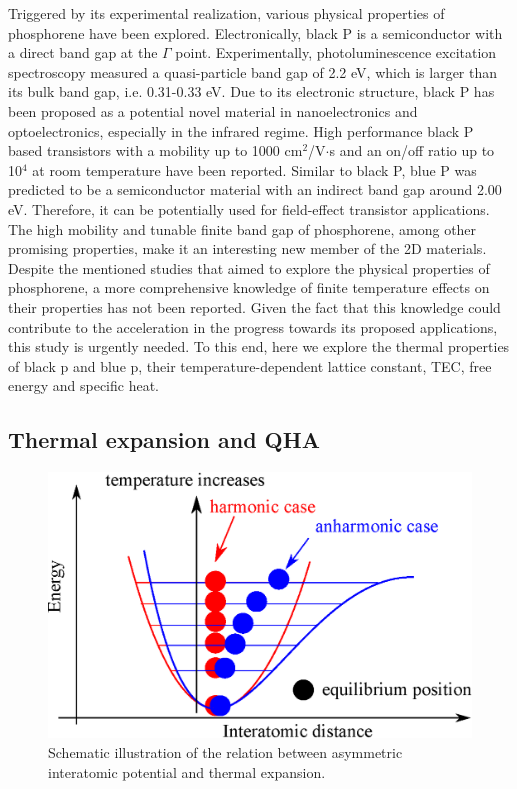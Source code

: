 Triggered by its experimental realization, various physical properties of phosphorene have been explored. Electronically, black P is a semiconductor with a direct band gap at the $\Gamma$ point\cite{Zhu2014,deniz3}. Experimentally, photoluminescence excitation spectroscopy measured a quasi-particle band gap of 2.2 eV\cite{bp-ex-3}, which is larger than its bulk band gap, i.e. 0.31-0.33 eV\cite{Maruyama198199,Narita1983422}. Due to its electronic structure, black P has been proposed as a potential novel material in nanoelectronics and optoelectronics, especially in the infrared regime. High performance black P based transistors with a mobility up to 1000 cm$^2$/V$\cdot$s and an on/off ratio up to 10$^4$ at room temperature have been reported\cite{Li2014,Han2014}. Similar to black P, blue P was predicted to be a semiconductor material with an indirect band gap around 2.00 eV\cite{Zhu2014}. Therefore, it can be potentially used for field-effect transistor applications. The high mobility and tunable finite band gap of phosphorene, among other promising properties\cite{Jain2015,Wei2014,Kou2014,Tahir2015,zhou2014}, make it an interesting new member of the 2D materials. Despite the mentioned studies that aimed to explore the physical properties of phosphorene, a more comprehensive knowledge of finite temperature effects on their properties has not been reported. Given the fact that this knowledge could contribute to the acceleration in the progress towards its proposed applications, this study\cite{Aierken2015.thermalP} is urgently needed. To this end, here we explore the thermal properties of black p and blue p, their temperature-dependent lattice constant, TEC, free energy and specific heat.

\subsection{Thermal expansion and QHA}

\begin{figure}[htbp!] 
\centering
\includegraphics[width=0.8\linewidth]{anh_exp.eps}%
\caption{Schematic illustration of the relation between asymmetric interatomic potential and thermal expansion. }
\label{fig:anh_exp}
\end{figure}

